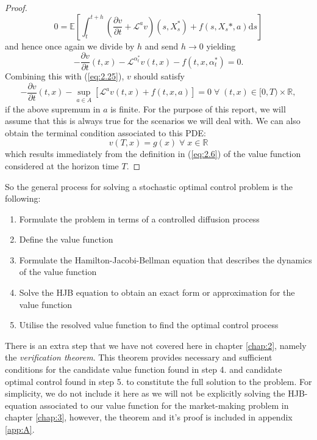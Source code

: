 \begin{proof}
    \begin{equation*}
        0=\mathbb{E}\left[\int_t^{t+h}\left(\frac{\partial v}{\partial t}+\mathcal{L}^av\right)(s,X_s^*)+f(s,X_s*,a)\mathrm ds\right]
    \end{equation*}
    and hence once again we divide by $h$ and send $h\rightarrow0$ yielding
    \begin{equation*}
        -\frac{\partial v}{\partial t}(t,x)-\mathcal{L}^{\alpha^*_t}v(t,x)-f(t,x,\alpha_t^*)=0.
    \end{equation*}
    Combining this with (\ref{eq:2.25}), $v$ should satisfy
    \begin{equation}
        -\frac{\partial v}{\partial t}(t,x)-\sup_{a\in A}\left[\mathcal{L}^av(t,x)+f(t,x,a)\right]=0\;\forall\;(t,x)\in[0,T)\times\mathbb{R},
    \end{equation}
    if the above supremum in $a$ is finite. For the purpose of this report, we will 
    assume that this is always true for the scenarios we will deal with. We can also 
    obtain the terminal condition associated to this PDE:
    \begin{equation}
        v(T,x)=g(x)\;\forall\;x\in\mathbb{R}
    \end{equation}
    which results immediately from the definition in (\ref{eq:2.6}) of the value function
    considered at the horizon time $T$.
\end{proof}

So the general process for solving a stochastic optimal control problem is the 
following:
\begin{enumerate}
    \item Formulate the problem in terms of a controlled diffusion process
    \item Define the value function 
    \item Formulate the Hamilton-Jacobi-Bellman equation that describes the dynamics 
    of the value function
    \item Solve the HJB equation to obtain an exact form or approximation for the 
    value function
    \item Utilise the resolved value function to find the optimal control process
\end{enumerate}

There is an extra step that we have not covered here in chapter \ref{chap:2},
namely the \emph{verification theorem}. This theorem provides necessary and sufficient 
conditions for the candidate value function found in step 4. and candidate optimal 
control found in step 5. to constitute the full solution to the problem. For simplicity,
we do not include it here as we will not be explicitly solving the HJB-equation associated 
to our value function for the market-making problem in chapter \ref{chap:3}, however,
the theorem and it's proof is included in appendix \ref{app:A}.

